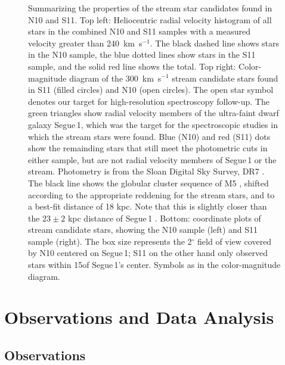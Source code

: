 \documentclass{emulateapj}
\begin{document}
\begin{figure}
\begin{center}
\begin{tabular}{cc}
  \end{tabular}
  \caption{ {\scriptsize Summarizing the properties of the stream star candidates found in N10 and S11. Top left: Heliocentric radial velocity histogram of all stars in the combined N10 and S11 samples with a measured velocity greater than 240~km~s$^{-1}$. The black dashed line shows stars in the N10 sample, the blue dotted lines show stars in the S11 sample, and the solid red line shows the total. Top right: Color-magnitude diagram of the 300~km~s$^{-1}$ stream candidate stars found in S11 (filled circles) and N10 (open circles). The open star symbol denotes our target for high-resolution spectroscopy follow-up. The green triangles show radial velocity members of the ultra-faint dwarf galaxy Segue\,1, which was the target for the spectroscopic studies in which the stream stars were found. Blue (N10) and red (S11) dots show the remainding stars that still meet the photometric cuts in either sample, but are not radial velocity members of Segue\,1 or the stream. Photometry is from the Sloan Digital Sky Survey, DR7 \citep{Abazajian2009}. The black line shows the globular cluster sequence of M5 \citep{An2008}, shifted according to the appropriate reddening for the stream stars, and to a best-fit distance of 18 kpc. Note that this is slightly closer than the $23 \pm 2$ kpc distance of Segue\,1 \citep{Belokurov2007}.    Bottom: coordinate plots of stream candidate stars, showing the N10 sample (left) and S11 sample (right). The box size represents the 2$^{\circ}$ field of view covered by N10 centered on Segue\,1; S11 on the other hand only  observed stars within 15\arcmin of Segue\,1's center. Symbols as in the color-magnitude diagram.} }
  \label{fig:col_mag}
 \end{center}
\end{figure}






\section{Observations and Data Analysis}
\label{sec:obs}




\subsection{Observations}
\end{document}
